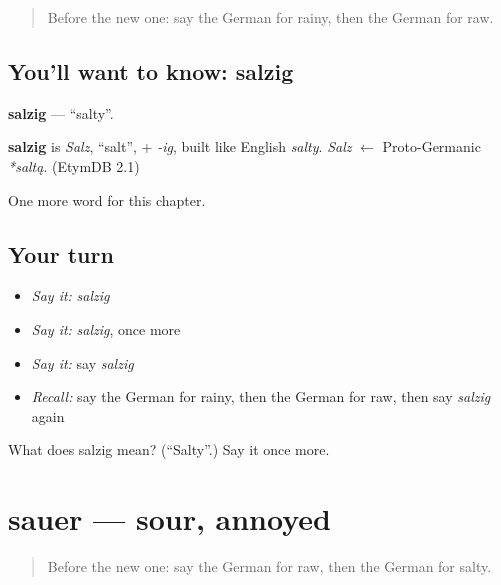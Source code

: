 \label{lesson:GE-C220-salzig}



\begin{quote}
Before the new one: say the German for rainy, then the German for raw.
\end{quote}

\subsection*{You'll want to know: salzig}
\textbf{salzig} — \textquotedblleft{}salty\textquotedblright{}.

\begin{cousinweb}
\textbf{salzig} is \emph{Salz}, \textquotedblleft{}salt\textquotedblright{}, + \emph{-ig}, built like English \emph{salty}. \emph{Salz} $\leftarrow$ Proto-Germanic \emph{*saltą}. (EtymDB 2.1)
\end{cousinweb}

\begin{grammarlens}[title={What you've built}]
One more word for this chapter.
\end{grammarlens}

\subsection*{Your turn}
\begin{itemize}
\raggedright
  \item \emph{Say it:} \emph{salzig}
  \item \emph{Say it:} \emph{salzig}, once more
  \item \emph{Say it:} say \emph{salzig}
  \item \emph{Recall:} say the German for rainy, then the German for raw, then say \emph{salzig} again
\end{itemize}

\begin{tcolorbox}[breakable,colback=teal!4,colframe=teal!35!black,title={Before you move on}]
What does salzig mean? (\textquotedblleft{}Salty\textquotedblright{}.) Say it once more.
\end{tcolorbox}
\section[sauer]{sauer — sour, annoyed}

\label{lesson:GE-C220-sauer}



\begin{quote}
Before the new one: say the German for raw, then the German for salty.
\end{quote}

